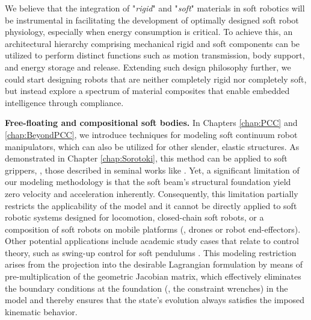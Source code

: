 We believe that the integration of "\textit{rigid}" and "\textit{soft}" materials in soft robotics will be instrumental in facilitating the development of optimally designed soft robot physiology, especially when energy consumption is critical. To achieve this, an architectural hierarchy comprising mechanical rigid and soft components can be utilized to perform distinct functions such as motion transmission, body support, and energy storage and release. Extending such design philosophy further, we could start designing robots that are neither completely rigid nor completely soft, but instead explore a spectrum of material composites that enable embedded intelligence through compliance.

\textbf{Free-floating and compositional soft bodies.} In Chapters \ref{chap:PCC} and \ref{chap:BeyondPCC}, we introduce techniques for modeling soft continuum robot manipulators, which can also be utilized for other slender, elastic structures. As demonstrated in Chapter \ref{chap:Sorotoki}, this method can be applied to soft grippers, \eg, those described in seminal works like \cite{Sinatra2019Aug,Suzumori1992}. Yet, a significant limitation of our modeling methodology is that the soft beam's structural foundation yield zero velocity and acceleration inherently. Consequently, this limitation partially restricts the applicability of the model and it cannot be directly applied to soft robotic systems designed for locomotion, closed-chain soft robots, or a composition of soft robots on mobile platforms (\eg, drones or robot end-effectors). Other potential applications include academic study cases that relate to control theory, such as swing-up control for soft pendulums \cite{Weerakoon2021Dec,DellaSantina2020Dec}. This modeling restriction arises from the projection into the desirable Lagrangian formulation by means of pre-multiplication of the geometric Jacobian matrix, which effectively eliminates the boundary conditions at the foundation (\ie, the constraint wrenches) in the model and thereby ensures that the state's evolution always satisfies the imposed kinematic behavior.

